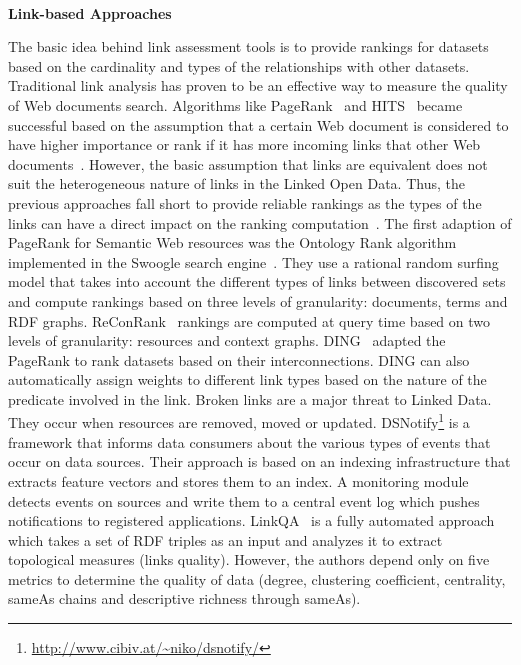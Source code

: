 \indent \\{\bf Link-based Approaches}

The basic idea behind link assessment tools is to provide rankings for datasets based on the cardinality and types of the relationships with other datasets. Traditional link analysis has proven to be an effective way to measure the quality of Web documents search. Algorithms like PageRank~\cite{Page:TechReport:98} and HITS~\cite{Kleinberg:ACM:99} became successful based on the assumption that a certain Web document is considered to have higher importance or rank if it has more incoming links that other Web documents~\cite{Brin:WWW:98}\cite{Chakrabarti:IEEE:99}. However, the basic assumption that links are equivalent does not suit the heterogeneous nature of links in the Linked Open Data. Thus, the previous approaches fall short to provide reliable rankings as the types of the links can have a direct impact on the ranking computation~\cite{Toupikov:LDOW:09}. The first adaption of PageRank for Semantic Web resources was the Ontology Rank algorithm implemented in the Swoogle search engine~\cite{Ding:CIKM:04}. They use a rational random surfing model that takes into account the different types of links between discovered sets and compute rankings based on three levels of granularity: documents, terms and RDF graphs. ReConRank~\cite{Hogan:SSKB:06} rankings are computed at query time based on two levels of granularity: resources and context graphs. DING~\cite{Toupikov:LDOW:09} adapted the PageRank to rank datasets based on their interconnections. DING can also automatically assign weights to different link types based on the nature of the predicate involved in the link. Broken links are a major threat to Linked Data. They occur when resources are removed, moved or updated. DSNotify\footnote{\url{http://www.cibiv.at/~niko/dsnotify/}}\cite{Haslhofer:IWS:09} is a framework that informs data consumers about the various types of events that occur on data sources. Their approach is based on an indexing infrastructure that extracts feature vectors and stores them to an index. A monitoring module detects events on sources and write them to a central event log which pushes notifications to registered applications. LinkQA~\cite{Gueret:ESWC:12} is a fully automated approach which takes a set of RDF triples as an input and analyzes it to extract topological measures (links quality). However, the authors depend only on five metrics to determine the quality of data (degree, clustering coefficient, centrality, sameAs chains and descriptive richness through sameAs).

